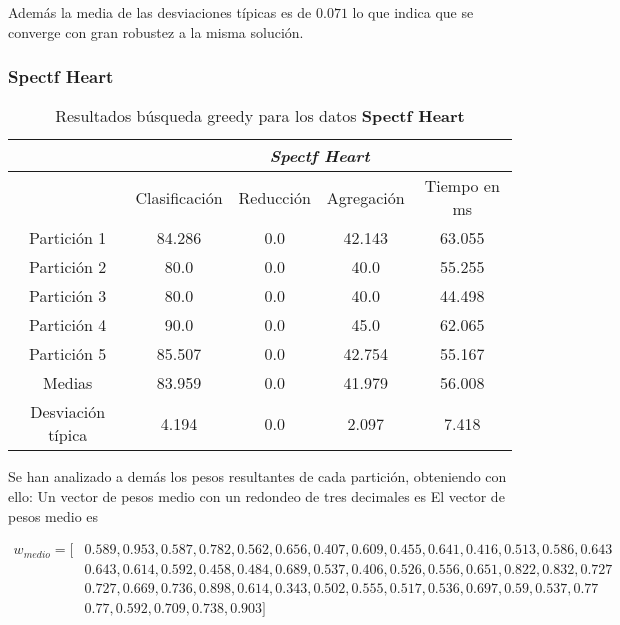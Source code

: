 Además la media de las desviaciones típicas es de $0.071$ lo que indica que se converge con gran robustez a la misma solución.



\subsubsection{Spectf Heart} 

\begin{table}[H]
  \centering
  \begin{tabular}{|c|c|c|c|c|}
    \hline
    & \multicolumn{4}{|c|}{\textit{Spectf Heart}}  \\
    \hline
    &	Clasificación &		Reducción	
    &	Agregación	&	Tiempo en ms \\
    \hline
    Partición 1	&    84.286  &  0.0  &  42.143  &  63.055    \\
    Partición 2 &	  80.0  &  0.0  &  40.0  &  55.255    \\
    Partición 3 &       80.0  &  0.0  &  40.0  &  44.498     \\
    Partición 4	&      90.0  &  0.0  &  45.0  &  62.065    \\
    Partición 5	&     85.507  &  0.0  &  42.754  &  55.167    \\
    \hline
    Medias 	 &    83.959  &  0.0  &  41.979  &  56.008   \\
    \hline
    Desviación típica &	   4.194  &  0.0  &  2.097  &  7.418    \\ 
    \hline  
  \end{tabular}
  \caption{Resultados búsqueda greedy para los datos \textbf{Spectf Heart}}
  \label{table:greedy_Spectf Heart}
\end{table}

Se han analizado a demás los pesos resultantes de cada partición, obteniendo con ello: 
Un vector de pesos medio con un redondeo de tres decimales es 
El vector de pesos medio es 

\begin{align*}
w_{medio} = [ 
    &   0.589, 0.953, 0.587, 0.782, 0.562, 0.656, 0.407, 0.609, 0.455, 0.641, 0.416, 0.513, 0.586, 0.643  \\
    &  0.643, 0.614, 0.592, 0.458, 0.484, 0.689, 0.537, 0.406, 0.526, 0.556, 0.651, 0.822, 0.832, 0.727  \\
    &  0.727, 0.669, 0.736, 0.898, 0.614, 0.343, 0.502, 0.555, 0.517, 0.536, 0.697, 0.59, 0.537, 0.77  \\
    &  0.77, 0.592, 0.709, 0.738, 0.903]
\end{align*}

